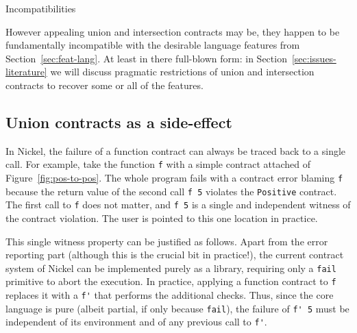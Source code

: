 \documentclass[sigplan,10pt,review,anonymous]{acmart}
\newcommand{\resolved}[2]{}
\newcommand{\nickel}[1]{\lstinline[language=nickel]{#1}}
\begin{document}
\resolved{Either here or the next section, show examples of unintuitive behaviour
of U and I. For example, I is not jos composition of contracts.
And union has to be treated as any one of the options.
Kindo of resolved for unions}



\section{Incompatibilities}
\label{sec:issues-sem}

However appealing union and intersection contracts may be, they happen
to be fundamentally incompatible with the desirable language
features from Section~\ref{sec:feat-lang}. At least in there
full-blown form: in Section~\ref{sec:issues-literature} we will
discuss pragmatic restrictions of union and intersection contracts to
recover some or all of the features.

\subsection{Union contracts as a side-effect}

In Nickel, the failure of a function contract can always be traced back to a
single call. For example, take the function \nickel{f} with a simple contract
attached of Figure~\ref{fig:pos-to-pos}. The whole program fails with a contract
error blaming \nickel{f} because the return value of the second call \nickel{f 5}
violates the \nickel{Positive} contract. The first call to \nickel{f} does
not matter, and \nickel{f 5} is a single and independent witness of the contract
violation. The user is pointed to this one location in practice.

This single witness property can be justified as follows. Apart from the error
reporting part (although this is the crucial bit in practice!), the current
contract system of Nickel can be implemented purely as a library, requiring only
a \nickel{fail} primitive to abort the execution. In practice, applying a
function contract to \nickel{f} replaces it with a \nickel{f'} that performs the
additional checks. Thus, since the core language is pure (albeit
partial, if only because \nickel{fail}), the failure of \nickel{f' 5}
must be independent of its environment and of any previous call to \nickel{f'}.

%
\end{document}
